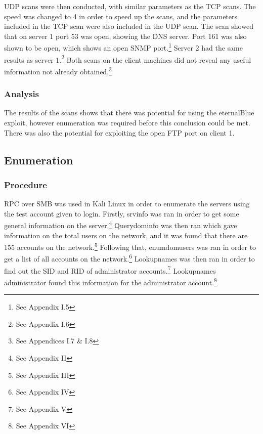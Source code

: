 \documentclass[12pt,a4paper]{article}
\begin{document}
			\acrshort{UDP} scans were then conducted, with similar parameters as the \acrshort{TCP} scans. The speed was changed to 4 in order to speed up the scans, and the parameters included in the \acrshort{TCP} scan were also included in the \acrshort{UDP} scan. The scan showed that on server 1 port 53 was open, showing the \acrshort{DNS} server. Port 161 was also shown to be open, which shows an open \acrshort{SNMP} port.\footnote{See Appendix I.5} Server 2 had the same results as server 1.\footnote{See Appendix I.6} Both scans on the client machines did not reveal any useful information not already obtained.\footnote{See Appendices I.7 \& I.8}

			\subsubsection{Analysis}
			The results of the scans shows that there was potential for using the eternalBlue exploit, however enumeration was required before this conclusion could be met. There was also the potential for exploiting the open \acrshort{FTP} port on client 1.

		\subsection{Enumeration}
			\subsubsection{Procedure}
				\acrshort{RPC} over \acrshort{SMB} was used in Kali Linux in order to enumerate the servers using the test account given to login. Firstly, srvinfo was ran in order to get some general information on the server.\footnote{See Appendix II} Querydominfo was then ran which gave information on the total users on the network, and it was found that there are 155 accounts on the network.\footnote{See Appendix III} Following that, enumdomusers was ran in order to get a list of all accounts on the network.\footnote{See Appendix IV} Lookupnames was then ran in order to find out the \acrshort{SID} and \acrshort{RID} of administrator accounts.\footnote{See Appendix V} Lookupnames administrator found this information for the administrator account.\footnote{See Appendix VI}
\end{document}
